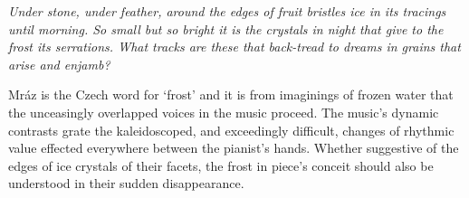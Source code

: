 \textit{ Under stone, under feather, around the edges of fruit bristles ice in
its tracings until morning. So small but so bright it is the crystals in night
that give to the frost its serrations. What tracks are these that back-tread to
dreams in grains that arise and enjamb? }

Mráz is the Czech word for `frost' and it is from imaginings of frozen water
that the unceasingly overlapped voices in the music proceed. The music’s
dynamic contrasts grate the kaleidoscoped, and exceedingly difficult, changes
of rhythmic value effected everywhere between the pianist’s hands. Whether
suggestive of the edges of ice crystals of their facets, the frost in piece’s
conceit should also be understood in their sudden disappearance.
